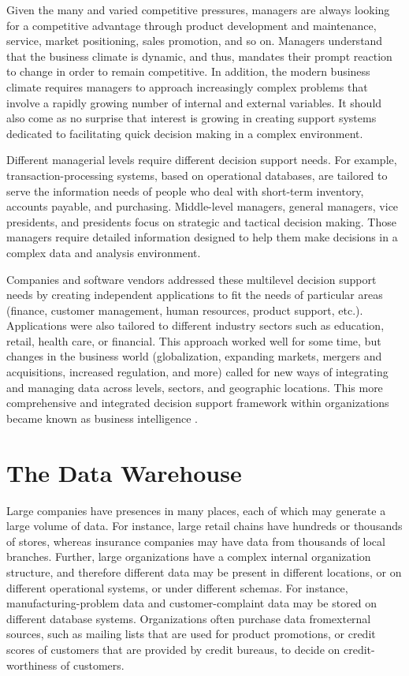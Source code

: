 \documentclass{vldb}
\begin{document}
Given the many and varied competitive pressures, managers are always looking for a competitive advantage through
product development and maintenance, service, market positioning, sales promotion, and so on. Managers understand
that the business climate is dynamic, and thus, mandates their prompt reaction to change in order to remain
competitive. In addition, the modern business climate requires managers to approach increasingly complex problems
that involve a rapidly growing number of internal and external variables. It should also come as no surprise that interest
is growing in creating support systems dedicated to facilitating quick decision making in a complex environment.

Different managerial levels require different decision support needs. For example, transaction-processing systems,
based on operational databases, are tailored to serve the information needs of people who deal with short-term
inventory, accounts payable, and purchasing. Middle-level managers, general managers, vice presidents, and presidents
focus on strategic and tactical decision making. Those managers require detailed information designed to help
them make decisions in a complex data and analysis environment.

Companies and software vendors addressed these multilevel decision support needs by creating independent
applications to fit the needs of particular areas (finance, customer management, human resources, product support,
etc.). Applications were also tailored to different industry sectors such as education, retail, health care, or financial. This
approach worked well for some time, but changes in the business world (globalization, expanding markets, mergers
and acquisitions, increased regulation, and more) called for new ways of integrating and managing data across levels,
sectors, and geographic locations. This more comprehensive and integrated decision support framework within
organizations became known as business intelligence \cite{carloDB:2011}.

\section{The Data Warehouse}
Large companies have presences in many places, each of which may generate
a large volume of data. For instance, large retail chains have hundreds or thousands
of stores, whereas insurance companies may have data from thousands
of local branches. Further, large organizations have a complex internal organization
structure, and therefore different data may be present in different locations,
or on different operational systems, or under different schemas. For instance,
manufacturing-problem data and customer-complaint data may be stored on different
database systems. Organizations often purchase data fromexternal sources,
such as mailing lists that are used for product promotions, or credit scores of customers
that are provided by credit bureaus, to decide on credit-worthiness of
customers.
\end{document}
